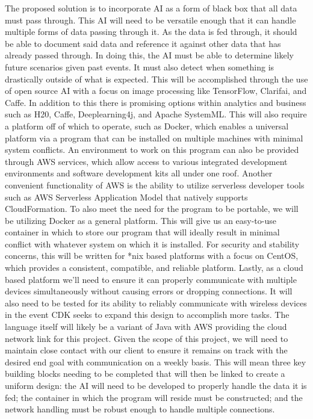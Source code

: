 \documentclass[onecolumn, draftclsnofoot,10pt, compsoc]{IEEEtran}
\begin{document}
	The proposed solution is to incorporate AI as a form of black box that all data must pass through. This AI will need to be versatile enough that it can handle multiple forms of data passing through it. As the data is fed through, it should be able to document said data and reference it against other data that has already passed through. In doing this, the AI must be able to determine likely future scenarios given past events. It must also detect when something is drastically outside of what is expected. This will be accomplished through the use of open source AI with a focus on image processing like TensorFlow, Clarifai, and Caffe. In addition to this there is promising options within analytics and business such as H20, Caffe, Deeplearning4j, and Apache SystemML. This will also require a platform off of which to operate, such as Docker, which enables a universal platform via a program that can be installed on multiple machines with minimal system conflicts. An environment to work on this program can also be provided through AWS services, which allow access to various integrated development environments and software development kits all under one roof. Another convenient functionality of AWS is the ability to utilize serverless developer tools such as AWS Serverless Application Model that natively supports CloudFormation. To also meet the need for the program to be portable, we will be utilizing Docker as a general platform. This will give us an easy-to-use container in which to store our program that will ideally result in minimal conflict with whatever system on which it is installed. For security and stability concerns, this will be written for *nix based platforms with a focus on CentOS, which provides a consistent, compatible, and reliable platform. Lastly, as a cloud based platform we’ll need to ensure it can properly communicate with multiple devices simultaneously without causing errors or dropping connections. It will also need to be tested for its ability to reliably communicate with wireless devices in the event CDK seeks to expand this design to accomplish more tasks. The language itself will likely be a variant of Java with AWS providing the cloud network link for this project. Given the scope of this project, we will need to maintain close contact with our client to ensure it remains on track with the desired end goal with communication on a weekly basis. This will mean three key building blocks needing to be completed that will then be linked to create a uniform design: the AI will need to be developed to properly handle the data it is fed; the container in which the program will reside must be constructed; and the network handling must be robust enough to handle multiple connections.
	
\end{document}
